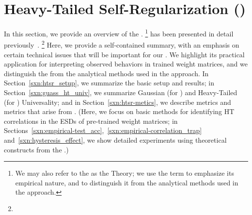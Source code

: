 \section{Heavy-Tailed Self-Regularization (\HTSR)}
\label{sxn:htsr}

In this section, we provide an overview of the \HTSR \Phenomenology.%
\footnote{We may also refer to the \HTSR \Phenomenology as the \HTSR Theory; we use the term \Phenomenology to emphasize its empirical nature, and to distinguish it from the analytical methods used in the \SETOL approach.}
\HTSR has been presented in detail previously~\cite{MM19_HTSR_ICML,MM20_SDM,MM18_TR_JMLRversion}.%
\footnote{} 
Here, we provide a self-contained summary, with an emphasis on certain technical issues that will be important for our \SETOL.
We highlight its practical application for interpreting observed behaviors in trained weight matrices, and 
we distinguish the \HTSR \Phenomenology from the analytical methods used in the \SETOL approach.
In Section~\ref{sxn:htsr_setup}, we summarize the basic \HTSR setup and results;
in Section~\ref{sxn:guass_ht_univ}, we summarize Gaussian (for \RMT) and Heavy-Tailed (for \HTRMT) Universality; and
in Section~\ref{sxn:htsr-metics}, we describe \SHAPE metrics and \SCALE metrics that arise from \HTSR.
(Here, we focus on basic methods for identifying HT correlations in the ESDs of pre-trained weight matrices; 
in Sections~\ref{sxn:empirical-test_acc},~\ref{sxn:empirical-correlation_trap} and~\ref{sxn:hysteresis_effect}, we show detailed experiments using theoretical constructs from the \HTSR \Phenomenology.)





